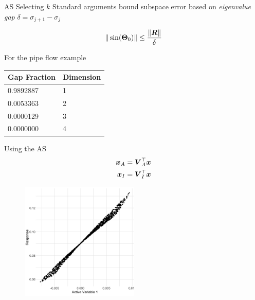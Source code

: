 \documentclass[14pt]{beamer}
\begin{document}
\begin{frame}{AS Selecting $k$}
  Standard arguments bound subspace error based on \emph{eigenvalue gap} $\delta
  = \sigma_{j+1} - \sigma_j$

  \begin{equation*}
    \|\sin(\boldsymbol{\Theta}_0)\| \leq \frac{\|\boldsymbol{R}\|}{\delta}
  \end{equation*}

  For the pipe flow example
  \begin{table}
    \centering
    \begin{tabular}{@{}ll@{}}
      \hline
      Gap Fraction & Dimension\\
      \hline
      0.9892887 & 1\\
      \hline
      0.0053363 & 2\\
      \hline
      0.0000129 & 3\\
      \hline
      0.0000000 & 4\\
      \hline
    \end{tabular}
  \end{table}

\end{frame}

\begin{frame}{Using the AS}
  \begin{equation*} \begin{aligned}
      \boldsymbol{x}_A &= \boldsymbol{V}_A^{\top}\boldsymbol{x} \\
      \boldsymbol{x}_I &= \boldsymbol{V}_I^{\top}\boldsymbol{x}
  \end{aligned} \end{equation*}

  \begin{figure}
    \centering
    \includegraphics[width=0.5\textwidth]{../../images/as_summary_nat}
  \end{figure}
\end{frame}
\end{document}
